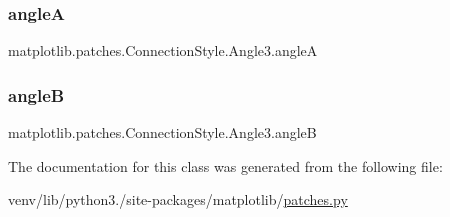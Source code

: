 \subsubsection{\texorpdfstring{angleA}{angleA}}
{\footnotesize\ttfamily matplotlib.\+patches.\+Connection\+Style.\+Angle3.\+angleA}

\mbox{\label{classmatplotlib_1_1patches_1_1ConnectionStyle_1_1Angle3_ae3a168d1d19b4259ec892145c5c14028}} 
\subsubsection{\texorpdfstring{angleB}{angleB}}
{\footnotesize\ttfamily matplotlib.\+patches.\+Connection\+Style.\+Angle3.\+angleB}



The documentation for this class was generated from the following file\+:\begin{DoxyCompactItemize}
\item 
venv/lib/python3./site-\/packages/matplotlib/\hyperlink{patches_8py}{patches.\+py}\end{DoxyCompactItemize}
